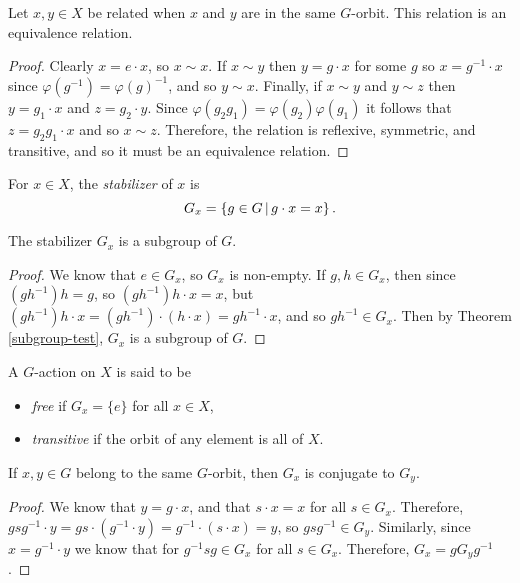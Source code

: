 \begin{prop}
    Let $x, y \in X$ be related when $x$ and $y$ are in the same $G$-orbit. This relation is an equivalence relation.
\end{prop}

\begin{proof}
    Clearly $x = e \cdot x$, so $x \sim x$. If $x \sim y$ then $y = g \cdot x$ for some $g$ so $x = g^{-1} \cdot x$ since $\varphi(g^{-1}) = \varphi(g)^{-1}$, and so $y \sim x$. Finally, if $x \sim y$ and $y \sim z$ then $y = g_1 \cdot x$ and $z = g_2 \cdot y$. Since $\varphi(g_2g_1) = \varphi(g_2)\varphi(g_1)$ it follows that $z = g_2g_1 \cdot x$ and so $x \sim z$. Therefore, the relation is reflexive, symmetric, and transitive, and so it must be an equivalence relation.
\end{proof}

\begin{defn}
    For $x \in X$, the \emph{stabilizer} of $x$ is
    \[G_x = \left\{g \in G \,\middle|\, g \cdot x = x\right\}.\]
\end{defn}

\begin{prop}
    The stabilizer $G_x$ is a subgroup of $G$.
\end{prop}

\begin{proof}
    We know that $e \in G_x$, so $G_x$ is non-empty. If $g, h \in G_x$, then since $(gh^{-1})h = g$, so $(gh^{-1})h \cdot x = x$, but $(gh^{-1})h \cdot x = (gh^{-1}) \cdot (h \cdot x) = gh^{-1} \cdot x$, and so $gh^{-1} \in G_x$. Then by Theorem \ref{subgroup-test}, $G_x$ is a subgroup of $G$.
\end{proof}

\begin{defn}
    A $G$-action on $X$ is said to be
    \begin{itemize}
        \item \emph{free} if $G_x = \{e\}$ for all $x \in X$,
        \item \emph{transitive} if the orbit of any element is all of $X$.
    \end{itemize}
\end{defn}

\begin{thm}\label{orbit-conjugate-stabilizers}
    If $x, y \in G$ belong to the same $G$-orbit, then $G_x$ is conjugate to $G_y$.
\end{thm}

\begin{proof}
    We know that $y = g \cdot x$, and that $s \cdot x = x$ for all $s \in G_x$. Therefore, $gsg^{-1} \cdot y = gs \cdot (g^{-1} \cdot y) = g^{-1} \cdot (s \cdot x) = y$, so $gsg^{-1} \in G_y$. Similarly, since $x = g^{-1} \cdot y$ we know that for $g^{-1}sg \in G_x$ for all $s \in G_x$. Therefore, $G_x = gG_yg^{-1}$.
\end{proof}

